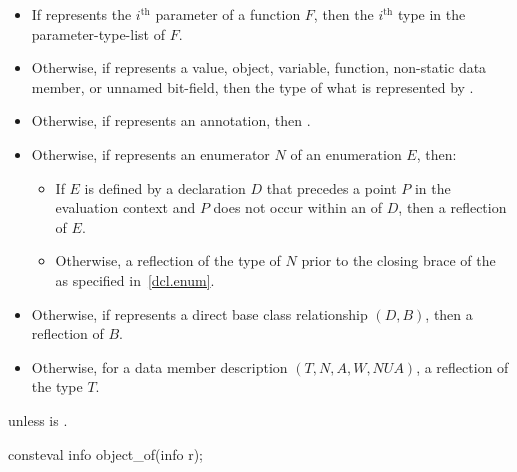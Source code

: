 \begin{itemdescr}
\pnum
\returns
\begin{itemize}
\item
  If  represents the $i^\text{th}$ parameter of a function $F$,
  then the $i^\text{th}$ type
  in the parameter-type-list of $F$.
\item
  Otherwise, if  represents a
  value,
  object,
  variable,
  function,
  non-static data member, or
  unnamed bit-field,
  then the type of what is represented by .
\item
  Otherwise, if  represents an annotation,
  then .
\item
  Otherwise, if  represents
  an enumerator $N$ of an enumeration $E$, then:
  \begin{itemize}
  \item
    If $E$ is defined by a declaration $D$
    that precedes a point $P$ in the evaluation context
    and $P$ does not occur within an  of $D$,
    then a reflection of $E$.
  \item
    Otherwise, a reflection of the type of $N$
    prior to the closing brace of the 
    as specified in~\ref{dcl.enum}.
  \end{itemize}
\item
  Otherwise, if  represents
  a direct base class relationship $(D, B)$,
  then a reflection of $B$.
\item
  Otherwise, for a data member description $(T, N, A, W, \mathit{NUA})$,
  a reflection of the type $T$.
\end{itemize}

\pnum
\throws
{} unless
 is .
\end{itemdescr}

%
\begin{itemdecl}
consteval info object_of(info r);
\end{itemdecl}

